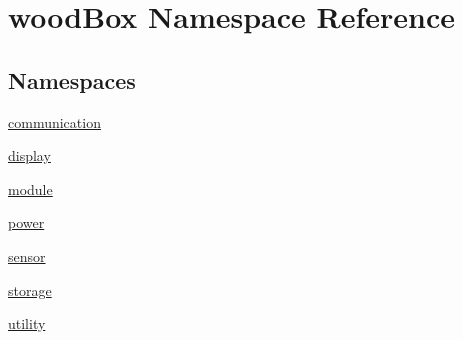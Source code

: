 \hypertarget{namespacewood_box}{}\section{wood\+Box Namespace Reference}
\label{namespacewood_box}
\subsection*{Namespaces}
\begin{DoxyCompactItemize}
\item 
 \mbox{\hyperlink{namespacewood_box_1_1communication}{communication}}
\item 
 \mbox{\hyperlink{namespacewood_box_1_1display}{display}}
\item 
 \mbox{\hyperlink{namespacewood_box_1_1module}{module}}
\item 
 \mbox{\hyperlink{namespacewood_box_1_1power}{power}}
\item 
 \mbox{\hyperlink{namespacewood_box_1_1sensor}{sensor}}
\item 
 \mbox{\hyperlink{namespacewood_box_1_1storage}{storage}}
\item 
 \mbox{\hyperlink{namespacewood_box_1_1utility}{utility}}
\end{DoxyCompactItemize}
